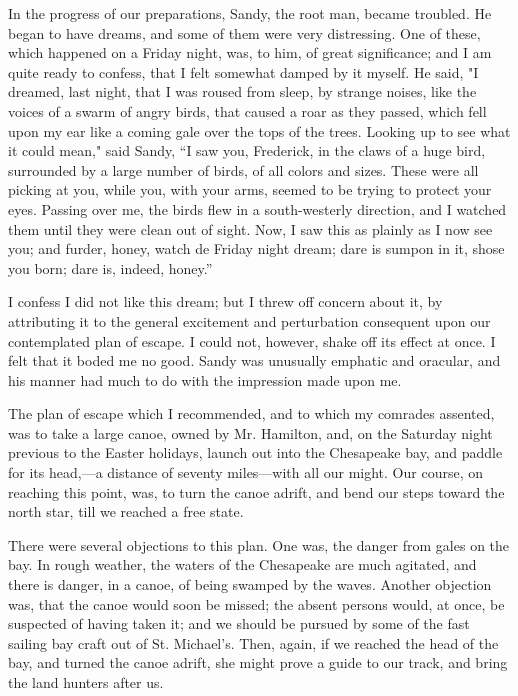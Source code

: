 In the progress of our preparations, Sandy, the root man, became
troubled. He began to have dreams, and some of them were very
distressing. One of these, which happened on a Friday night, was, to
him, of great significance; and I am quite ready to confess, that I felt
somewhat damped by it myself. He said, "I dreamed, last night, that I
was roused from sleep, by strange noises, like the voices of a swarm of
angry birds, that caused a roar as they passed, which fell {}upon my ear
like a coming gale over the tops of the trees. Looking up to see what it
could mean," said Sandy, ``I saw you, Frederick, in the claws of a huge
bird, surrounded by a large number of birds, of all colors and sizes.
These were all picking at you, while you, with your arms, seemed to be
trying to protect your eyes. Passing over me, the birds flew in a
south-westerly direction, and I watched them until they were clean out
of sight. Now, I saw this as plainly as I now see you; and furder,
honey, watch de Friday night dream; dare is sumpon in it, shose you
born; dare is, indeed, honey.''

I confess I did not like this dream; but I threw off concern about it,
by attributing it to the general excitement and perturbation consequent
upon our contemplated plan of escape. I could not, however, shake off
its effect at once. I felt that it boded me no good. Sandy was unusually
emphatic and oracular, and his manner had much to do with the impression
made upon me.

The plan of escape which I recommended, and to which my comrades
assented, was to take a large canoe, owned by Mr. Hamilton, and, on the
Saturday night previous to the Easter holidays, launch out into the
Chesapeake bay, and paddle for its head,---a distance of seventy
miles---with all our might. Our course, on reaching this point, was, to
turn the canoe adrift, and bend our steps toward the north star, till we
reached a free state.

There were several objections to this plan. One was, the danger from
gales on the bay. In rough weather, the waters of the Chesapeake are
much {}agitated, and there is danger, in a canoe, of being swamped by
the waves. Another objection was, that the canoe would soon be missed;
the absent persons would, at once, be suspected of having taken it; and
we should be pursued by some of the fast sailing bay craft out of St.
Michael's. Then, again, if we reached the head of the bay, and turned
the canoe adrift, she might prove a guide to our track, and bring the
land hunters after us.

